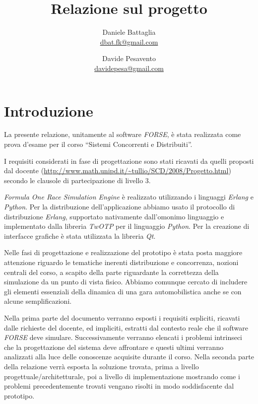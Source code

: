 \documentclass[11pt,a4paper]{report}
\title{Relazione sul progetto}
\author{Daniele Battaglia\\\url{dbat.fk@gmail.com}
	\and Davide Pesavento\\\url{davidepesa@gmail.com}}
\date{}
\newcommand{\Erlang}{\textsl{Erlang}}
\newcommand{\Python}{\textsl{Python}}
\begin{document}
\maketitle

\tableofcontents

\clearpage


\chapter{Introduzione}
La presente relazione, unitamente al software \textsl{FORSE}, è stata realizzata come prova d'esame per il corso ``Sistemi Concorrenti e Distribuiti''.

I requisiti considerati in fase di progettazione sono stati ricavati da quelli proposti dal docente (\url{http://www.math.unipd.it/~tullio/SCD/2008/Progetto.html})
secondo le clausole di partecipazione di livello 3.

\textsl{Formula One Race Simulation Engine} è realizzato utilizzando i linguaggi \Erlang{} e \Python{}. Per la distribuzione dell'applicazione abbiamo
usato il protocollo di distribuzione \Erlang{}, supportato nativamente dall'omonimo linguaggio e implementato dalla libreria \textsl{TwOTP} per il linguaggio
\Python{}.
Per la creazione di interfacce grafiche è stata utilizzata la libreria \textsl{Qt}.

Nelle fasi di progettazione e realizzazione del prototipo è stata posta maggiore attenzione riguardo le tematiche inerenti distribuzione e concorrenza, nozioni
centrali del corso, a scapito della parte riguardante la correttezza della simulazione da un punto di vista fisico. Abbiamo comunque cercato di includere
gli elementi essenziali della dinamica di una gara automobilistica anche se con alcune semplificazioni.

Nella prima parte del documento verranno esposti i requisiti espliciti, ricavati dalle richieste del docente, ed impliciti, estratti dal contesto reale che il software \textsl{FORSE} deve simulare.
Successivamente verranno elencati i problemi intrinseci che la progettazione del sistema deve affrontare e questi ultimi verranno analizzati alla luce delle conoscenze acquisite durante il corso.
Nella seconda parte della relazione verrà esposta la soluzione trovata, prima a livello progettuale/architetturale, poi a livello di implementazione mostrando come i problemi precedentemente trovati vengano risolti in modo soddisfacente dal prototipo.
\end{document}
